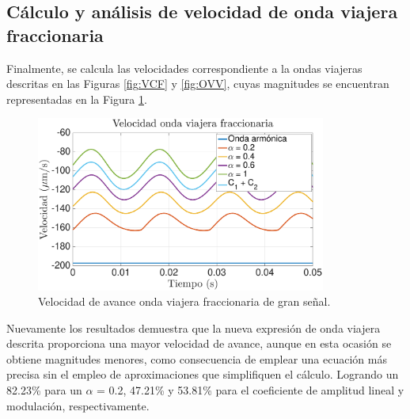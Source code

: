 \subsection{Cálculo y análisis de velocidad de onda viajera fraccionaria} \label{sec:analisis_velocidad2}
Finalmente, se calcula las velocidades correspondiente a la ondas viajeras descritas en las Figuras \ref{fig:VCF} y \ref{fig:OVV}, cuyas magnitudes se encuentran representadas en la Figura \ref{fig:VCFB}.
\begin{figure}[!h] %
	\vspace*{3mm}
    \centering
    \includegraphics[width=0.85\textwidth]{Figuras/VCFB}
  	\caption{Velocidad de avance onda viajera fraccionaria de gran señal.}
  	\label{fig:VCFB}
\end{figure}

Nuevamente los resultados demuestra que la nueva expresión de onda viajera descrita proporciona una mayor velocidad de avance, aunque en esta ocasión se obtiene magnitudes menores, como consecuencia de emplear una ecuación más precisa sin el empleo de aproximaciones que simplifiquen el cálculo. Logrando un 82.23\% para un $\alpha$ = 0.2, 47.21\% y 53.81\% para el coeficiente de amplitud lineal y modulación, respectivamente.\\


